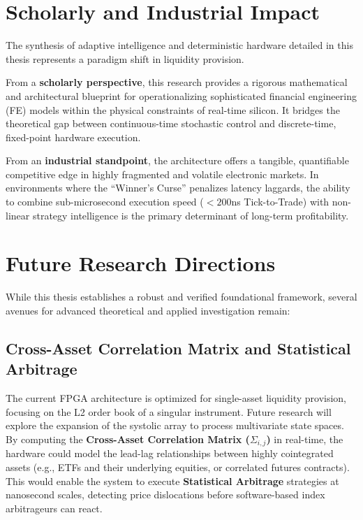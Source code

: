 \section{Scholarly and Industrial Impact}
The synthesis of adaptive intelligence and deterministic hardware detailed in this thesis represents a paradigm shift in liquidity provision. 

From a \textbf{scholarly perspective}, this research provides a rigorous mathematical and architectural blueprint for operationalizing sophisticated financial engineering (FE) models within the physical constraints of real-time silicon. It bridges the theoretical gap between continuous-time stochastic control and discrete-time, fixed-point hardware execution.

From an \textbf{industrial standpoint}, the architecture offers a tangible, quantifiable competitive edge in highly fragmented and volatile electronic markets. In environments where the ``Winner's Curse'' penalizes latency laggards, the ability to combine sub-microsecond execution speed ($<200$ns Tick-to-Trade) with non-linear strategy intelligence is the primary determinant of long-term profitability.

\section{Future Research Directions}
While this thesis establishes a robust and verified foundational framework, several avenues for advanced theoretical and applied investigation remain:

\subsection{Cross-Asset Correlation Matrix and Statistical Arbitrage}
The current FPGA architecture is optimized for single-asset liquidity provision, focusing on the L2 order book of a singular instrument. Future research will explore the expansion of the systolic array to process multivariate state spaces. By computing the \textbf{Cross-Asset Correlation Matrix ($\Sigma_{i,j}$)} in real-time, the hardware could model the lead-lag relationships between highly cointegrated assets (e.g., ETFs and their underlying equities, or correlated futures contracts). This would enable the system to execute \textbf{Statistical Arbitrage} strategies at nanosecond scales, detecting price dislocations before software-based index arbitrageurs can react.

